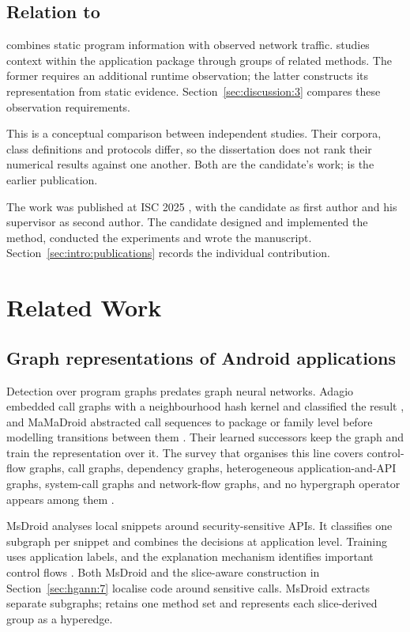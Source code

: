 \subsection*{Relation to \hybroid{}}

\hybroid{} combines static program information with observed network traffic.
\hgann{} studies context within the application package through groups of related methods.
The former requires an additional runtime observation; the latter constructs its representation
from static evidence. Section~\ref{sec:discussion:3} compares these observation requirements.

This is a conceptual comparison between independent studies. Their corpora, class definitions
and protocols differ, so the dissertation does not rank their numerical results against one
another. Both are the candidate's work; \hybroid{} is the earlier publication.

The work was published at ISC 2025 \cite{norouzian2025hgannmal}, with the candidate as first
author and his supervisor as second author. The candidate designed and implemented the method,
conducted the experiments and wrote the manuscript. Section~\ref{sec:intro:publications}
records the individual contribution.

\section{Related Work}
\label{sec:hgann:2}

\subsection*{Graph representations of Android applications}

Detection over program graphs predates graph neural networks. Adagio embedded call graphs with a
neighbourhood hash kernel and classified the result \cite{gascon2013structural}, and MaMaDroid
abstracted call sequences to package or family level before modelling transitions between them
\cite{onwuzurike2019mamadroid}. Their learned successors keep the graph and train the
representation over it. The survey that organises this line covers control-flow graphs, call
graphs, dependency graphs, heterogeneous application-and-API graphs, system-call graphs and
network-flow graphs, and no hypergraph operator appears among them \cite{bilot2024survey}.

MsDroid analyses local snippets around security-sensitive APIs. It classifies one subgraph per
snippet and combines the decisions at application level. Training uses application labels, and
the explanation mechanism identifies important control flows \cite{he2023msdroid}. Both MsDroid
and the slice-aware construction in Section~\ref{sec:hgann:7} localise code around sensitive
calls. MsDroid extracts separate subgraphs; \hgann{} retains one method set and represents each
slice-derived group as a hyperedge.

